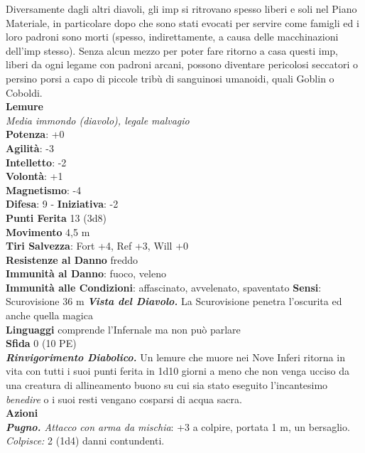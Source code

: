 \begin{multicols}{2}
Diversamente dagli altri diavoli, gli imp si ritrovano spesso liberi e soli nel Piano Materiale, in particolare dopo che sono stati evocati per servire come famigli ed i loro padroni sono morti (spesso, indirettamente, a causa delle macchinazioni dell’imp stesso). Senza alcun mezzo per poter fare ritorno a casa questi imp, liberi da ogni legame con padroni arcani, possono diventare pericolosi seccatori o persino porsi a capo di piccole tribù di sanguinosi umanoidi, quali Goblin o Coboldi.\\


\medskip\textbf{Lemure}\\
\emph{Media immondo (diavolo), legale malvagio}\\
\textbf{Potenza}: +0\\
\textbf{Agilità}: -3\\
\textbf{Intelletto}: -2\\
\textbf{Volontà}: +1\\
\textbf{Magnetismo}: -4\\
\textbf{Difesa}: 9 - \textbf{Iniziativa}: -2\\
\textbf{Punti Ferita} 13 (3d8)\\
\textbf{Movimento} 4,5 m\\
\textbf{Tiri Salvezza}: Fort +4, Ref +3, Will +0\\
\textbf{Resistenze al Danno} freddo\\
\textbf{Immunità al Danno}: fuoco, veleno\\
\textbf{Immunità alle Condizioni}: affascinato, avvelenato, spaventato
\textbf{Sensi}: Scurovisione 36 m
\emph{\textbf{Vista del Diavolo.}} La Scurovisione penetra l'oscurita ed anche quella magica\\
\textbf{Linguaggi} comprende l'Infernale ma non può parlare\\
\textbf{Sfida} 0 (10 PE)\smallskip\\
\emph{\textbf{Rinvigorimento Diabolico.}} Un lemure che muore nei Nove Inferi ritorna in vita con tutti i suoi punti ferita in 1d10 giorni a meno che non venga ucciso da una creatura di allineamento buono su cui sia stato eseguito l'incantesimo \emph{benedire} o i suoi resti vengano cosparsi di acqua sacra.\\
\smallskip\textbf{Azioni} \\
\emph{\textbf{Pugno.} Attacco con arma da mischia}: +3 a colpire, portata 1 m, un bersaglio.\\
\emph{Colpisce:} 2 (1d4) danni contundenti.\\

\end{multicols}
